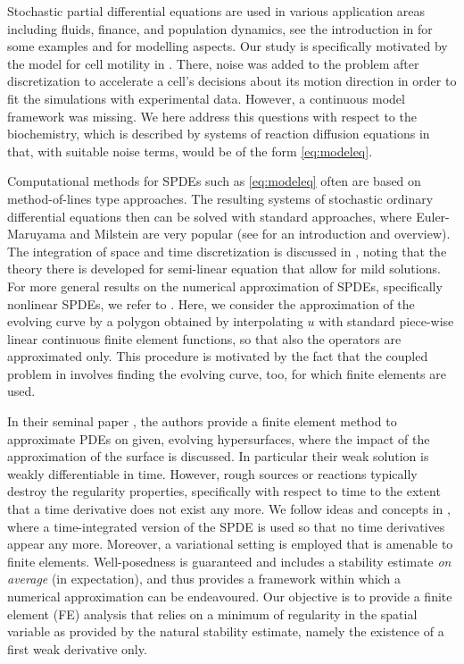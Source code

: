 \documentclass[a4paper,10pt]{article}
\numberwithin{equation}{section}
\begin{document}
Stochastic partial differential equations are used in various application areas including fluids, finance, and population dynamics, see the introduction in \cite{Pardoux} for some examples and \cite{SigKueSta2015,KraGomBakEtAl2018} for modelling aspects. Our study is specifically motivated by the model for cell motility in \cite{EllStiVen2012}. There, noise was added to the problem after discretization to accelerate a cell's decisions about its motion direction in order to fit the simulations with experimental data. However, a continuous model framework was missing. We here address this questions with respect to the biochemistry, which is described by systems of reaction diffusion equations in \cite{EllStiVen2012} that, with suitable noise terms, would be of the form \eqref{eq:modeleq}. 

Computational methods for SPDEs such as \eqref{eq:modeleq} often are based on method-of-lines type approaches.
The resulting systems of stochastic ordinary differential equations then can be solved with standard approaches, where Euler-Maruyama and Milstein are very popular (see \cite{Pla1999} for an introduction and overview). The integration of space and time discretization is discussed in \cite{Powell}, noting that the theory there is developed for semi-linear equation that allow for mild solutions. For more general results on the numerical approximation of SPDEs, specifically nonlinear SPDEs, we refer to \cite{OndProWal2023}. Here, we consider the approximation of the evolving curve by a polygon obtained by interpolating $u$ with standard piece-wise linear continuous finite element functions, so that also the operators are approximated only. This procedure is motivated by the fact that the coupled problem in \cite{EllStiVen2012} involves finding the evolving curve, too, for which finite elements are used.

In their seminal paper \cite{DE07}, the authors provide a finite element method to approximate PDEs on given, evolving hypersurfaces, where the impact of the approximation of the surface is discussed. In particular their weak solution is weakly differentiable in time. However, rough sources or reactions typically destroy the regularity properties, specifically with respect to time to the extent that a time derivative does not exist any more. We follow ideas and concepts in \cite{RoecknerBuch}, where a time-integrated version of the SPDE is used so that no time derivatives appear any more. Moreover, a variational setting is employed that is amenable to finite elements. Well-posedness is guaranteed and includes a stability estimate \emph{on average} (in expectation), and thus provides a framework within which a numerical approximation can be endeavoured. Our objective is to provide a finite element (FE) analysis that relies on a minimum of regularity in the spatial variable as provided by the natural stability estimate, namely the existence of a first weak derivative only.
\end{document}
